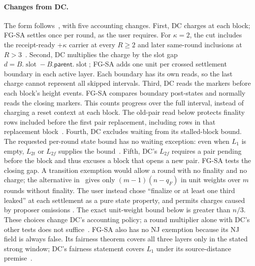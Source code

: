 \documentclass{article}
\theoremstyle{plain}
\theoremstyle{definition}
\theoremstyle{remark}
\newcommand{\slot}{\operatorname{slot}}
\newcommand{\parent}{\mathsf{parent}}
\newcommand{\DC}[1]{\cite[\S#1]{DC}}
\begin{document}
\paragraph{Changes from DC.}
The form follows~\DC{8}, with five accounting changes.
First, DC charges at each block; FG-SA settles once per round, as the
user requires.  For $\kappa=2$, the cut includes the receipt-ready +$\kappa$
carrier at every $R\geq2$
and later same-round inclusions at $R>3$~\cite[\S2]{LS183}.
Second, DC multiplies the charge by the slot gap
$d=B.\slot-B.\parent.\slot$; FG-SA adds one unit per crossed
settlement boundary in each active layer.  Each boundary has its own
reads, so the last charge cannot represent all skipped intervals.
Third, DC reads the markers before each block's height events.
FG-SA compares boundary post-states and normally reads the closing
markers.  This counts progress over the full interval, instead of
charging a reset context at each block.  The old-pair read below
protects finality rows included before the first pair replacement,
including rows in that replacement block~\cite[\S\S2--3]{LS183}.
Fourth, DC excludes waiting from its stalled-block bound.  The requested
per-round state bound has no waiting exception: even when $L_1$ is
empty, $L_{2t}$ or $L_{2f}$ supplies the bound~\cite[\S3.2]{RL179}.
Fifth, DC's $L_{2f}$ requires a pair pending before the block and thus
excuses a block that opens a new pair.  FG-SA tests the closing gap.
A transition exemption would allow a round with no finality and no
charge; the alternative in~\cite[\S\S1,3.3,6.1]{RL179} gives only
$(m-1)(n-q_F)$ in unit weights over $m$ rounds without finality.  The user instead chose
``finalize or at least one third leaked'' at each settlement as a pure
state property, and permits charges caused by proposer omissions
\cite[\S1]{LS183}.  The exact unit-weight bound below is greater than
$n/3$.  These choices change DC's accounting policy; a round multiplier
alone with DC's other tests does not suffice~\cite[\S6.1]{RL179}.
FG-SA also has no NJ exemption because its NJ field is always false.
Its fairness theorem covers all three layers only in the stated strong
window; DC's fairness statement covers $L_1$ under its source-distance
premise~\DC{8}.
\end{document}
